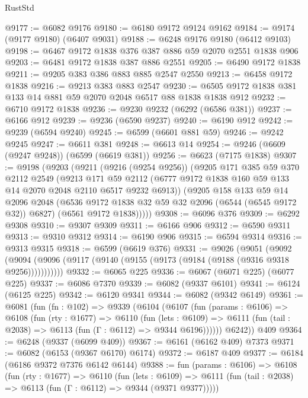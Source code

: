 \begin{lexlean}{RustStd}
\begin{coremodule}
@9177 := @6082 @9176
@9180 := @6180 @9172 @9124 @9162
@9184 := @9174 (@9177 @9180) (@6407 @9031)
@9188 := @6248 @9176 @9180 (@6412 @9103)
@9198 := @6467 @9172 @1838 @376 @387 @886 @59 @2070 @2551 @1838 @906
@9203 := @6481 @9172 @1838 @387 @886 @2551
@9205 := @6490 @9172 @1838
@9211 := @9205 @383 @386 @883 @885 @2547 @2550
@9213 := @6458 @9172 @1838
@9216 := @9213 @383 @883 @2547
@9230 := @6505 @9172 @1838 @381 @133 @14 @881 @59 @2070 @2048 @6517 @88 @1838 @1838 @912
@9232 := @6710 @9172 @1838
@9236 := @9230 @9232 (@6292 (@6586 @381))
@9237 := @6166 @912
@9239 := @9236 (@6590 @9237)
@9240 := @6190 @912
@9242 := @9239 (@6594 @9240)
@9245 := @6599 (@6601 @881 @59)
@9246 := @9242 @9245
@9247 := @6611 @381
@9248 := @6613 @14
@9254 := @9246 (@6609 (@9247 @9248)) (@6599 (@6619 @381))
@9256 := @6623 (@7175 @1838)
@9307 := @9198
    (@9203
      (@9211
        (@9216 (@9254 @9256))
        (@9205
          @171
          @385
          @59
          @370
          @2112
          @2549
          (@9213
            @171
            @59
            @2112
            (@6777 @9172 @1838 @160 @59 @133 @14 @2070 @2048 @2110 @6517 @9232 @6913))
          (@9205
            @158
            @133
            @59
            @14
            @2096
            @2048
            (@6536 @9172 @1838 @32 @59 @32 @2096 (@6544 (@6545 @9172 @32)) @6827)
            (@6561 @9172 @1838)))))
@9308 := @6096 @376
@9309 := @6292 @9308
@9310 := @9307 @9309
@9311 := @6166 @906
@9312 := @6590 @9311
@9313 := @9310 @9312
@9314 := @6190 @906
@9315 := @6594 @9314
@9316 := @9313 @9315
@9318 := @6599 (@6619 @376)
@9331 := @9026
    (@9051
      (@9092 (@9094 (@9096 (@9117 (@9140 (@9155 (@9173 (@9184 (@9188 (@9316 @9318 @9256)))))))))))
@9332 := @6065 @225
@9336 := @6067 (@6071 @225) (@6077 @225)
@9337 := @6086 @7370
@9339 := @6082 (@9337 @6101)
@9341 := @6124 (@6125 @225)
@9342 := @6120 @9341
@9344 := @6082 (@9342 @6149)
@9361 := @6081
    (fun (fn : @102) =>
    @9339
      (@6104
        (@6107
          (fun (params : @6106) =>
          @6108
            (fun (rty : @1677) =>
            @6110
              (fun (lets : @6109) =>
              @6111 (fun (tail : @2038) => @6113 (fun (Γ : @6112) => @9344 @6196))))))
        @6242))
    @409
@9364 := @6248 (@9337 (@6099 @409))
@9367 := @6161 (@6162 @409) @7373
@9371 := @6082 (@6153 (@9367 @6170) @6174)
@9372 := @6187 @409
@9377 := @6184 (@6186 @9372 @7376 @6142 @6144)
@9388 := fun (params : @6106) =>
  @6108
    (fun (rty : @1677) =>
    @6110
      (fun (lets : @6109) =>
      @6111 (fun (tail : @2038) => @6113 (fun (Γ : @6112) => @9344 (@9371 @9377)))))

\end{coremodule}
\end{lexlean}
